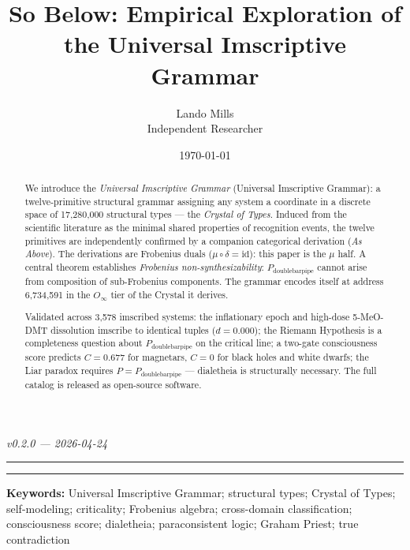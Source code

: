 \documentclass[12pt,a4paper]{article}
\newcommand{\UIG}{Universal Imscriptive Grammar}
\newcommand{\Ppms}{P_{\text{doublebarpipe}}}
\newcommand{\Oinf}{O_\infty}
\begin{document}
\title{So Below: Empirical Exploration of the Universal Imscriptive Grammar}

\author{Lando Mills \\ \normalsize Independent Researcher}
\date{\today}

\maketitle

\emph{v0.2.0 --- 2026-04-24}

\begin{center}
\rule{0.5\textwidth}{0.4pt}
\end{center}

\begin{abstract}
We introduce the \emph{Universal Imscriptive Grammar} (\UIG): a twelve-primitive
structural grammar assigning any system a coordinate in a discrete space of
17,280,000 structural types --- the \emph{Crystal of Types}. Induced from the
scientific literature as the minimal shared properties of recognition events, the
twelve primitives are independently confirmed by a companion categorical derivation
(\emph{As Above}). The derivations are Frobenius duals ($\mu \circ \delta = \text{id}$):
this paper is the $\mu$ half. A central theorem establishes \emph{Frobenius
non-synthesizability}: $\Ppms$ cannot arise from composition of sub-Frobenius
components. The grammar encodes itself at address 6,734,591 in the $\Oinf$ tier of
the Crystal it derives.

Validated across 3,578 imscribed systems: the inflationary epoch and high-dose
5-MeO-DMT dissolution imscribe to identical tuples ($d = 0.000$); the Riemann
Hypothesis is a completeness question about $\Ppms$ on the critical line; a two-gate
consciousness score predicts $C = 0.677$ for magnetars, $C = 0$ for black holes and
white dwarfs; the Liar paradox requires $P = \Ppms$ --- dialetheia is structurally
necessary. The full catalog is released as open-source software.
\end{abstract}

\begin{center}
\rule{0.5\textwidth}{0.4pt}
\end{center}

\noindent\textbf{Keywords:} Universal Imscriptive Grammar; structural types;
Crystal of Types; self-modeling; criticality; Frobenius algebra;
cross-domain classification; consciousness score; dialetheia;
paraconsistent logic; Graham Priest; true contradiction
\end{document}
